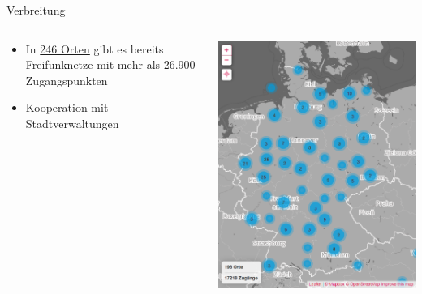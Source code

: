 \documentclass[t]{beamer}
\begin{document}
  \begin{frame}{Verbreitung}
    \begin{columns}
      \begin{column}{0.6\textwidth}
	\begin{itemize}
	  \item In  \href{http://freifunk.net/wie-mache-ich-mit/community-finden/}{246 Orten} gibt es bereits Freifunknetze mit mehr als 26.900 Zugangspunkten
	  \item Kooperation mit Stadtverwaltungen
	\end{itemize}
      \end{column}
      \begin{column}{0.4\textwidth}
	\begin{center}
	  \includegraphics[width=\textwidth]{Bilder/community-map-2015-08-13}
	\end{center}
      \end{column}
    \end{columns}
  \end{frame}
  
\end{document}
